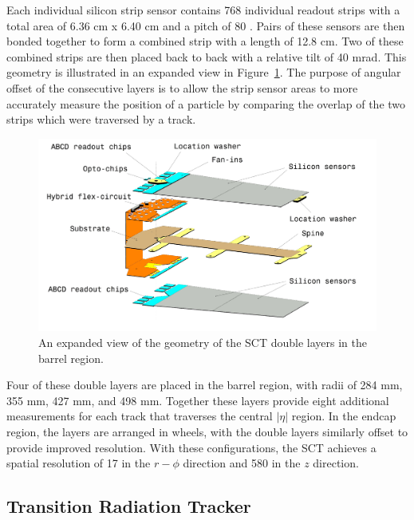 Each individual silicon strip sensor contains 768 individual readout strips with a total area of 6.36 cm x 6.40 cm and a pitch of 80 \um. 
Pairs of these sensors are then bonded together to form a combined strip with a length of 12.8 cm.
Two of these combined strips are then placed back to back with a relative tilt of 40 mrad.
This geometry is illustrated in an expanded view in Figure~\ref{fig:sct_geometry}.
The purpose of angular offset of the consecutive layers is to allow the strip sensor areas to more accurately measure the position of a particle by comparing the overlap of the two strips which were traversed by a track.

\begin{figure}[hbtp]
\centering
\includegraphics[width=\fullfig]{figures/sct_geometry.png}
\caption{An expanded view of the geometry of the \ac{SCT} double layers in the barrel region.}
\label{fig:sct_geometry}
\end{figure}

Four of these double layers are placed in the barrel region, with radii of 284 mm, 355 mm, 427 mm, and 498 mm. 
Together these layers provide eight additional measurements for each track that traverses the central $|\eta|$ region.
In the endcap region, the layers are arranged in wheels, with the double layers similarly offset to provide improved resolution.
With these configurations, the \ac{SCT} achieves a spatial resolution of 17 \um in the $r-\phi$ direction and 580 \um in the $z$ direction.

\subsection{Transition Radiation Tracker}

